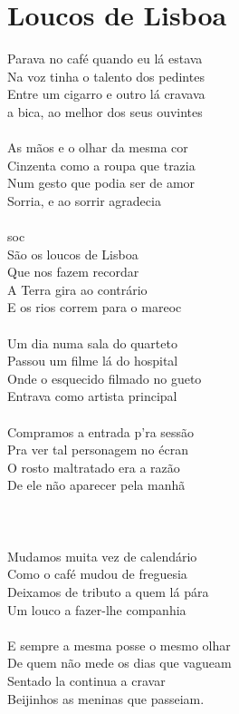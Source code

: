 \documentclass{article}
\begin{document}
\section{ Loucos de Lisboa}
Parava no café quando eu lá estava\\
Na voz tinha o talento dos pedintes\\
Entre um cigarro e outro lá cravava\\
a bica, ao melhor dos seus ouvintes\\
\\
As mãos e o olhar da mesma cor\\
Cinzenta como a roupa que trazia\\
Num gesto que podia ser de amor\\
Sorria, e ao sorrir agradecia\\
\\
{soc}\\
São os loucos de Lisboa\\
Que nos fazem recordar\\
A Terra gira ao contrário\\
E os rios correm para o mar{eoc}\\
\\
Um dia numa sala do quarteto\\
Passou um filme lá do hospital\\
Onde o esquecido filmado no gueto\\
Entrava como artista principal\\
\\
Compramos a entrada p'ra sessão\\
Pra ver tal personagem no écran\\
O rosto maltratado era a razão\\
De ele não aparecer pela manhã\\
\\
[refrão]\\
\\
Mudamos muita vez de calendário\\
Como o café mudou de freguesia\\
Deixamos de tributo a quem lá pára\\
Um louco a fazer-lhe companhia\\
\\
E sempre a mesma posse o mesmo olhar\\
De quem não mede os dias que vagueam\\
Sentado la continua a cravar\\
Beijinhos as meninas que passeiam.\\
\\
[refrão]\\
\end{document}
